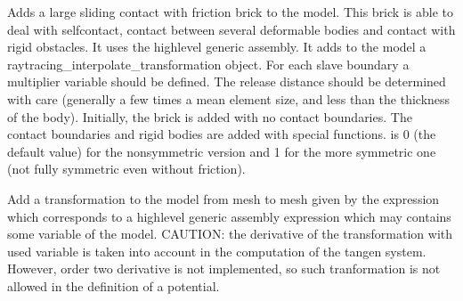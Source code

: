 \documentclass[a4paper,11pt,english]{sphinxmanual}
\begin{document}
\begin{fulllineitems}
\begin{fulllineitems}
Adds a large sliding contact with friction brick to the model.
This brick is able to deal with self\sphinxhyphen{}contact, contact between
several deformable bodies and contact with rigid obstacles.
It uses the high\sphinxhyphen{}level generic assembly. It adds to the model
a raytracing\_interpolate\_transformation object.
For each slave boundary a multiplier variable should be defined.
The release distance should be determined with care
(generally a few times a mean element size, and less than the
thickness of the body). Initially, the brick is added with no contact
boundaries. The contact boundaries and rigid bodies are added with
special functions.  is 0 (the default value) for the
non\sphinxhyphen{}symmetric version and 1 for the more symmetric one
(not fully symmetric even without friction).

\end{fulllineitems}


\begin{fulllineitems}
\label{\detokenize{python/cmdref_Model:getfem.Model.add_interpolate_transformation_from_expression}}
Add a transformation to the model from mesh  to mesh
 given by the expression  which corresponds to a
high\sphinxhyphen{}level generic assembly expression which may contains some
variable of the model. CAUTION: the derivative of the
transformation with used variable is taken into account in the
computation of the tangen system. However, order two derivative is not
implemented, so such tranformation is not allowed in the definition
of a potential.

\end{fulllineitems}



\end{fulllineitems}
\end{document}

